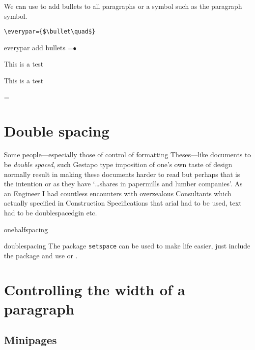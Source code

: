 We can use  to add bullets to all paragraphs or a symbol such as the paragraph symbol.
\medskip

\verb+\everypar={$\bullet\quad$}+

\begin{texexample}{everypar add bullets}{}
\everypar={$\bullet\quad$}

This is a test

This is a test

\everypar={}
\end{texexample}

\section{Double spacing}

Some people---especially those of control of formatting Theses---like documents to be \textit{double spaced}, such Gestapo type imposition of one's own taste of design normally result in making these documents harder to read but perhaps that is the intention or as \cite{Abrahams2003, Wilson2009} they have `\ldots shares in papermills and lumber companies'. As an Engineer I had countless encounters with overzealous Consultants which actually specified in Construction Specifications that arial had to be used, text had to be doublespacedgin etc. 

\begin{docCommand}{onehalfspacing}{}
\begin{docCommand}{doublespacing}{}
The package \texttt{setspace} \cite{setspace} can be used to make life easier, just include the package and use  or .
\end{docCommand}
\end{docCommand}


\section{Controlling the width of a paragraph}
\subsection{Minipages}


